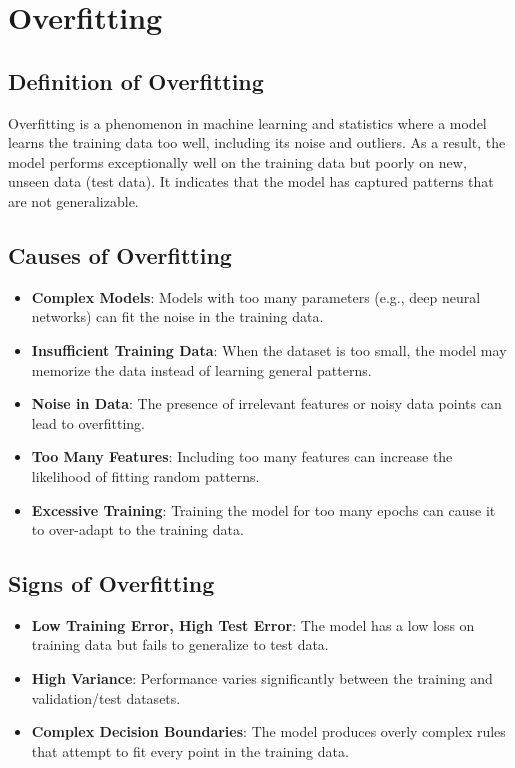 \section{Overfitting}

\subsection*{Definition of Overfitting}
Overfitting is a phenomenon in machine learning and statistics where a model learns the training data too well, including its noise and outliers. As a result, the model performs exceptionally well on the training data but poorly on new, unseen data (test data). It indicates that the model has captured patterns that are not generalizable.

\subsection*{Causes of Overfitting}
\begin{itemize}
    \item \textbf{Complex Models}: Models with too many parameters (e.g., deep neural networks) can fit the noise in the training data.
    \item \textbf{Insufficient Training Data}: When the dataset is too small, the model may memorize the data instead of learning general patterns.
    \item \textbf{Noise in Data}: The presence of irrelevant features or noisy data points can lead to overfitting.
    \item \textbf{Too Many Features}: Including too many features can increase the likelihood of fitting random patterns.
    \item \textbf{Excessive Training}: Training the model for too many epochs can cause it to over-adapt to the training data.
\end{itemize}

\subsection*{Signs of Overfitting}
\begin{itemize}
    \item \textbf{Low Training Error, High Test Error}: The model has a low loss on training data but fails to generalize to test data.
    \item \textbf{High Variance}: Performance varies significantly between the training and validation/test datasets.
    \item \textbf{Complex Decision Boundaries}: The model produces overly complex rules that attempt to fit every point in the training data.
\end{itemize}

